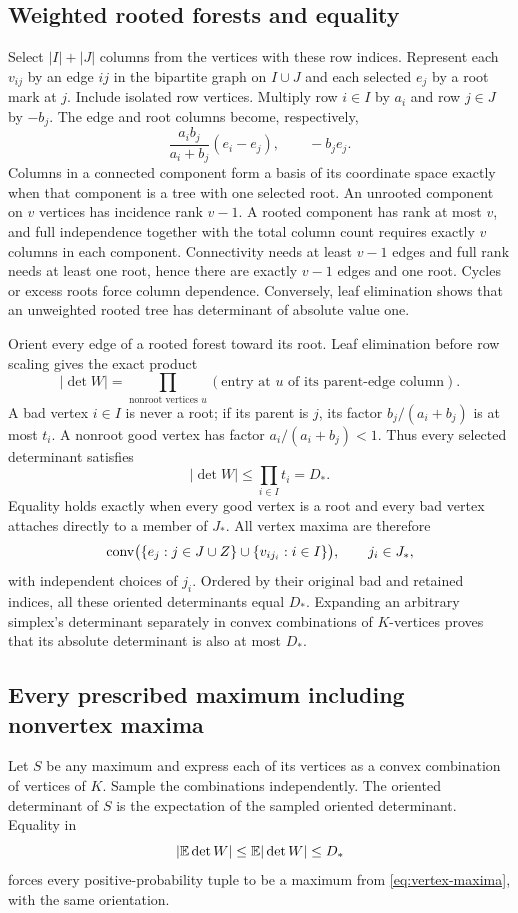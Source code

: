 \subsection{Weighted rooted forests and equality}
Select $|I|+|J|$ columns from the vertices with these row indices.
Represent each $v_{ij}$ by an edge $ij$ in the bipartite graph on $I\cup J$
and each selected $e_j$ by a root mark at $j$. Include isolated row
vertices. Multiply row $i\in I$ by $a_i$ and row $j\in J$ by $-b_j$.
The edge and root columns become, respectively,
\[
 \frac{a_ib_j}{a_i+b_j}(e_i-e_j),\qquad -b_je_j.
\]
Columns in a connected component form a basis of its coordinate space
exactly when that component is a tree with one selected root. An unrooted
component on $v$ vertices has incidence rank $v-1$. A rooted component
has rank at most $v$, and full independence together with the total column
count requires exactly $v$ columns in each component. Connectivity needs
at least $v-1$ edges and full rank needs at least one root, hence there
are exactly $v-1$ edges and one root. Cycles or excess roots force
column dependence. Conversely, leaf elimination shows that an unweighted
rooted tree has determinant of absolute value one.

Orient every edge of a rooted forest toward its root. Leaf elimination
before row scaling gives the exact product
\begin{equation}\label{eq:forest-product}
 |\det W|=\prod_{\text{nonroot vertices }u}
       (\text{entry at }u\text{ of its parent-edge column}).
\end{equation}
A bad vertex $i\in I$ is never a root; if its parent is $j$, its factor
$b_j/(a_i+b_j)$ is at most $t_i$. A nonroot good vertex has factor
$a_i/(a_i+b_j)<1$. Thus every selected determinant satisfies
\[
 |\det W|\le\prod_{i\in I}t_i=D_*.
\]
Equality holds exactly when every good vertex is a root and every bad
vertex attaches directly to a member of $J_*$. All vertex maxima are
therefore
\begin{equation}\label{eq:vertex-maxima}
 \operatorname{conv}\bigl(\{e_j:j\in J\cup Z\}\cup\{v_{i j_i}:i\in I\}\bigr),
 \qquad j_i\in J_*,
\end{equation}
with independent choices of $j_i$. Ordered by their original bad and
retained indices, all these oriented determinants equal $D_*$. Expanding
an arbitrary simplex's determinant separately in convex combinations of
$K$-vertices proves that its absolute determinant is also at most $D_*$.

\subsection{Every prescribed maximum including nonvertex maxima}
Let $S$ be any maximum and express each of its vertices as a convex
combination of vertices of $K$. Sample the combinations independently.
The oriented determinant of $S$ is the expectation of the sampled
oriented determinant. Equality in
\[
 |\mathbb E\det W|\le\mathbb E|\det W|\le D_*
\]
forces every positive-probability tuple to be a maximum from
\eqref{eq:vertex-maxima}, with the same orientation.

